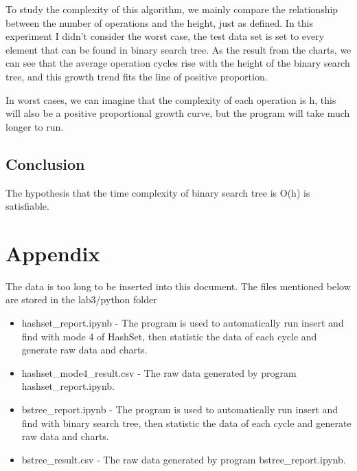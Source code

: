 \documentclass[a4]{article}
\begin{document}
\noindent To study the complexity of this algorithm, we mainly compare the relationship between the number of operations and the height, just as defined. In this experiment I didn't consider the worst case, the test data set is set to every element that can be found in binary search tree. As the result from the charts, we can see that the average operation cycles rise with the height of the binary search tree, and this growth trend fits the line of positive proportion.

\noindent In worst cases, we can imagine that the complexity of each operation is h, this will also be a positive proportional growth curve, but the program will take much longer to run.
\subsection{Conclusion}
The hypothesis that the time complexity of binary search tree is O(h) is satisfiable.\\

\section{Appendix}

The data is too long to be inserted into this document. The files mentioned below are stored in the lab3/python folder

\begin{itemize}
\item hashset\_report.ipynb - The program is used to automatically run insert and find with mode 4 of HashSet, then statistic the data of each cycle and generate raw data and charts.
\item hashset\_mode4\_result.csv - The raw data generated by program hashset\_report.ipynb.
\item bstree\_report.ipynb - The program is used to automatically run insert and find with binary search tree, then statistic the data of each cycle and generate raw data and charts.
\item bstree\_result.csv - The raw data generated by program bstree\_report.ipynb.
\end{itemize}
\end{document}
